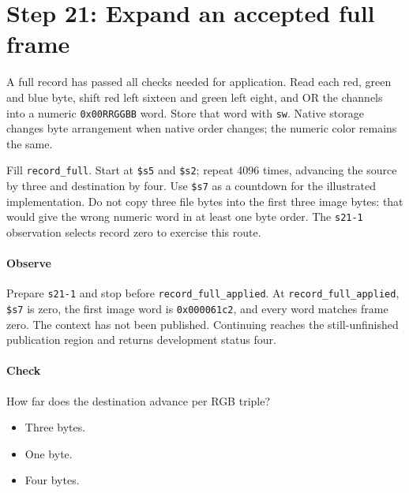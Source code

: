 \section{Step 21: Expand an accepted full frame}
A full record has passed all checks needed for application. Read each red,
green and blue byte, shift red left sixteen and green left eight, and OR the
channels into a numeric \texttt{0x00RRGGBB} word. Store that word with
\texttt{sw}. Native storage changes byte arrangement when native order changes;
the numeric color remains the same.

Fill \texttt{record\_full}. Start at \texttt{\$s5} and \texttt{\$s2}; repeat
4096 times, advancing the source by three and destination by four. Use
\texttt{\$s7} as a countdown for the illustrated implementation. Do not copy
three file bytes into the first three image bytes: that would give the wrong
numeric word in at least one byte order. The \texttt{s21-1} observation selects
record zero to exercise this route.

\paragraph{Observe} Prepare \texttt{s21-1} and stop before
\texttt{record\_full\_applied}. At \texttt{record\_full\_applied}, \texttt{\$s7} is zero,
the first image word is \texttt{0x000061c2}, and every word matches frame
zero. The context has not been published. Continuing reaches the still-unfinished
publication region and returns development status four.

\paragraph{Check} How far does the destination advance per RGB triple?
\begin{itemize}
  \item[A.] Three bytes.
  \item[B.] One byte.
  \item[C.] Four bytes.
\end{itemize}
